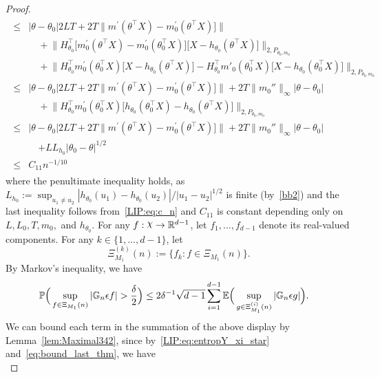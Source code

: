 {\begin{proof}
\begin{align}
\begin{split}
   \le{}& |\theta -\theta_0| 2 L T+ 2 T \big\| m^\prime (\theta^\top X ) -m_0^\prime (\theta^\top X)\big] \big\|\\
  &\quad + \Big\|H_{\theta_0}^\top \big[m_0^\prime (\theta^\top X)-m_0^\prime (\theta_0^\top X)\big] \big[X- h_{\theta_0} (\theta^\top X)\big]\Big\|_{2, P_{\theta_0, m_0}}\\
  &\quad + \Big\|H_{\theta_0}^\top m_0^\prime (\theta_0^\top X)\big[X- h_{\theta_0} (\theta^\top X)\big] - H_{\theta_0}^\top m'_0(\theta_0^\top X)\big[ X- h_{\theta_0}(\theta_0^\top X)\big]\Big\|_{2, P_{\theta_0, m_0}}\\
\le{}& |\theta -\theta_0| 2 L T+ 2 T \big\| m^\prime (\theta^\top X ) -m_0^\prime (\theta^\top X)\big] \big\| +  2 T \|m_0''\|_{\infty} |\theta -\theta_0| \\
  &\quad + \Big\|H_{\theta_0}^\top m_0^\prime (\theta_0^\top X)\big[h_{\theta_0}(\theta_0^\top X)- h_{\theta_0} (\theta^\top X)\big]\Big\|_{2, P_{\theta_0, m_0}}\\
  \le{}& { |\theta -\theta_0| 2 L T+ 2 T  \big\| m^\prime (\theta^\top X ) -m_0^\prime (\theta^\top X)\big] \big\| +  2 T \|m_0''\|_{\infty} |\theta -\theta_0|} \\
  &\quad { + L L_{h_0}|\theta_0- \theta|^{1/2}}\\
  \le{}& C_{11} n^{-1/10}
 \end{split}
\end{align}
{ where  the penultimate inequality holds, as $L_{h_0} := \sup_{u_1\neq u_2}| h_{\theta_0}(u_1)- h_{\theta_0}(u_2)|/|u_1-u_2|^{1/2}$ is finite (by~\ref{bb2}) and the last inequality follows from~\eqref{LIP:eq:c_n} and $C_{11}$ is constant depending only on $L,L_0, T, m_0,$ and $h_{\theta_0}$.}
For any $f: \rchi \to \R^{d-1}$, let $f_1,\ldots, f_{d-1}$ denote its real-valued components. For any $k\in \{1, \ldots, d-1\}$, let 
\[ \Xi_{M_1}^{(k)}(n) := \{f_k : f\in \Xi_{M_1}(n)\}.\]  By Markov's inequality, we have 
\begin{align}\label{eq:cvxdim_split}
\begin{split}
&\p\Big(\sup_{f \in \Xi_{M_1}(n) } |\g_n \epsilon f|> \frac{\delta}{2}\Big)
 \le{} 2  \delta^{-1} \sqrt{d-1}\sum_{i=1}^{d-1} \mathbb{E}  \Big(\sup_{g \in \Xi_{M_1}^{(i)}(n) } |\g_n \epsilon g|\Big).
\end{split}
\end{align}
We can bound each term in the summation of the above display by Lemma~\ref{lem:Maximal342},  since by~\eqref{LIP:eq:entropY_xi_star} and~\eqref{eq:bound_last_thm}, we have 
{ \begin{equation}\label{eq:f_i_req1}

\end{equation}}
\end{proof}}
